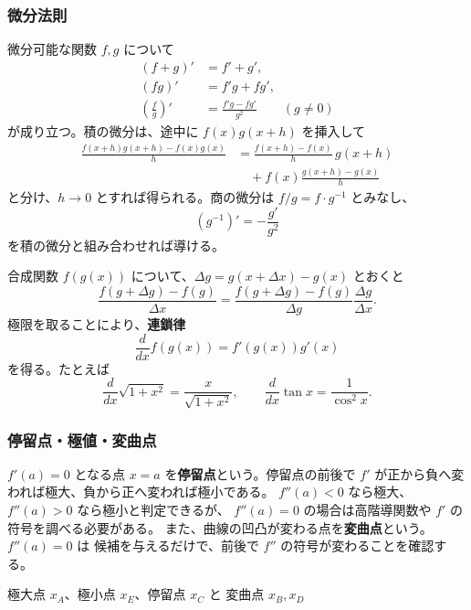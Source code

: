 \subsubsection{微分法則}

微分可能な関数 $f,g$ について
\begin{align}
 (f+g)'&=f'+g',\\
 (fg)'&=f'g+fg',\\
 \left(\frac fg\right)'&=\frac{f'g-fg'}{g^2}\qquad(g\ne0)
\end{align}
が成り立つ。積の微分は、途中に $f(x)g(x+h)$ を挿入して
\begin{align*}
 \frac{f(x+h)g(x+h)-f(x)g(x)}h
 &=\frac{f(x+h)-f(x)}h\,g(x+h)\\
 &\quad+f(x)\frac{g(x+h)-g(x)}h
\end{align*}
と分け、$h\to0$ とすれば得られる。商の微分は
$f/g=f\cdot g^{-1}$ とみなし、
\[
 (g^{-1})'=-\frac{g'}{g^2}
\]
を積の微分と組み合わせれば導ける。

合成関数 $f(g(x))$ について、$\Delta g=g(x+\Delta x)-g(x)$ とおくと
\[
 \frac{f(g+\Delta g)-f(g)}{\Delta x}
 =\frac{f(g+\Delta g)-f(g)}{\Delta g}\frac{\Delta g}{\Delta x}.
\]
極限を取ることにより、\textbf{連鎖律}
\begin{equation}
 \boxed{\frac{d}{dx}f(g(x))=f'(g(x))g'(x)}
\end{equation}
を得る。たとえば
\[
 \frac{d}{dx}\sqrt{1+x^2}=\frac{x}{\sqrt{1+x^2}},\qquad
 \frac{d}{dx}\tan x=\frac1{\cos^2x}.
\]

\subsubsection{停留点・極値・変曲点}

$f'(a)=0$ となる点 $x=a$ を\textbf{停留点}という。停留点の前後で
$f'$ が正から負へ変われば極大、負から正へ変われば極小である。
$f''(a)<0$ なら極大、$f''(a)>0$ なら極小と判定できるが、
$f''(a)=0$ の場合は高階導関数や $f'$ の符号を調べる必要がある。
また、曲線の凹凸が変わる点を\textbf{変曲点}という。$f''(a)=0$ は
候補を与えるだけで、前後で $f''$ の符号が変わることを確認する。

\begin{center}

\small 極大点 $x_A$、極小点 $x_E$、停留点 $x_C$ と
変曲点 $x_B,x_D$
\end{center}


